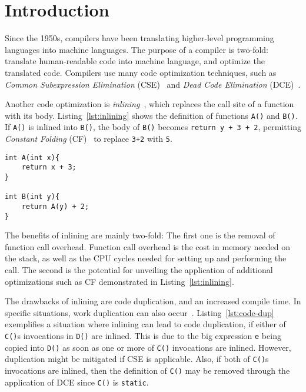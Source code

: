 
\section{Introduction}
\label{introduction}

Since the 1950s, compilers have been translating higher-level programming
languages into machine languages. The purpose of a compiler is two-fold:
translate human-readable code into machine language, and optimize the translated
code. Compilers use many code optimization techniques, such as \textit{Common
Subexpression Elimination} (CSE)~\cite[Ch. 8.5]{DragonBook} and
\textit{Dead Code Elimination} (DCE)~\cite[Ch. 8.5]{DragonBook}.

Another code optimization is \textit{inlining}~\cite[Ch. 12.1]{DragonBook},
which replaces the call site of a function with its body.
Listing~\ref{lst:inlining} shows the definition of functions \lstinline!A()! and
\lstinline!B()!. If \lstinline!A()! is inlined into \lstinline!B()!, the body of
\lstinline!B()! becomes \lstinline!return y + 3 + 2!, permitting
\textit{Constant Folding} (CF)~\cite[Ch. 8.5]{DragonBook} to replace
\lstinline!3+2! with \lstinline!5!.

\begin{centering}
	\noindent\begin{minipage}{\textwidth}
		\begin{CenteredBox}
		\begin{lstlisting}[style=global_customcpp]
int A(int x){
	return x + 3;
}

int B(int y){
	return A(y) + 2;
}
		\end{lstlisting}
		\end{CenteredBox}
	\end{minipage}
	\label{lst:inlining}
\end{centering}

The benefits of inlining are mainly two-fold: The first one is the removal of
function call overhead. Function call overhead is the cost in memory needed on
the stack, as well as the CPU cycles needed for setting up and performing the
call. The second is the potential for unveiling the application of additional
optimizations such as CF demonstrated in Listing~\ref{lst:inlining}.

The drawbacks of inlining are code duplication, and an increased compile time.
In specific situations, work duplication can also occur~\cite{GHCPaper}.
Listing~\ref{lst:code-dup} exemplifies a situation where inlining can lead to
code duplication, if either of \lstinline!C()!s invocations in \lstinline!D()!
are inlined. This is due to the big expression \lstinline!e! being copied into
\lstinline!D()! as soon as one or more of \lstinline!C()! invocations are
inlined. However,  duplication might be mitigated if CSE is applicable. Also, if
both of \lstinline!C()!s invocations are inlined, then the definition of
\lstinline!C()! may be removed through the application of DCE since
\lstinline!C()! is \lstinline!static!.

